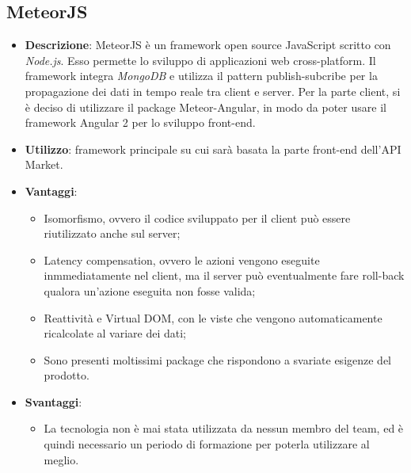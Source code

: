 \subsection{MeteorJS}
\begin{itemize}
	\item \textbf{Descrizione}: MeteorJS è un framework open source JavaScript scritto con \textit{Node.js}. Esso permette lo sviluppo di applicazioni web cross-platform. Il framework integra \textit{MongoDB} e utilizza il pattern publish-subcribe per la propagazione dei dati in tempo reale tra client e server. Per la parte client, si è deciso di utilizzare il package Meteor-Angular, in modo da poter usare il framework Angular 2 per lo sviluppo front-end.
	\item \textbf{Utilizzo}: framework principale su cui sarà basata la parte front-end dell'API Market.
	\item \textbf{Vantaggi}:
	\begin{itemize}
		\item Isomorfismo, ovvero il codice sviluppato per il client può essere riutilizzato anche sul server;
		\item Latency compensation, ovvero le azioni vengono eseguite inmmediatamente nel client, ma il server può eventualmente fare roll-back qualora un'azione eseguita non fosse valida;
		\item Reattività e Virtual DOM, con le viste che vengono automaticamente ricalcolate al variare dei dati;
		\item Sono presenti moltissimi package che rispondono a svariate esigenze del prodotto.
	\end{itemize}
	\item \textbf{Svantaggi}:
	\begin{itemize}
		\item La tecnologia non è mai stata utilizzata da nessun membro del team, ed è quindi necessario un periodo di formazione per poterla utilizzare al meglio.
	\end{itemize}
\end{itemize}

